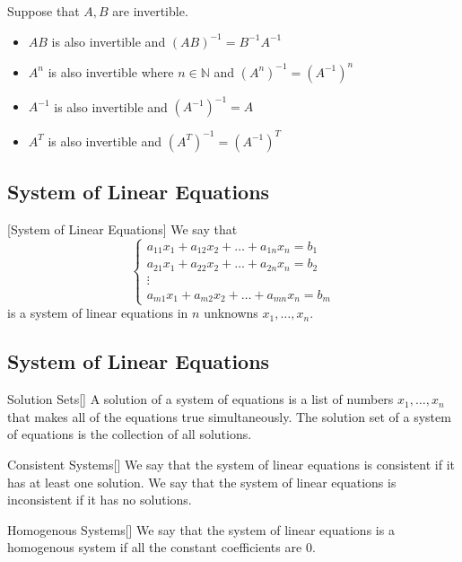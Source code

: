 \begin{thm}{}{} Suppose that $A,B$ are invertible. 
\begin{itemize}
\item $AB$ is also invertible and $(AB)^{-1}=B^{-1}A^{-1}$
\item $A^n$ is also invertible where $n\in\mathbb{N}$ and $(A^n)^{-1}=(A^{-1})^n$
\item $A^{-1}$ is also invertible and $(A^{-1})^{-1}=A$
\item $A^T$ is also invertible and $(A^T)^{-1}=(A^{-1})^T$
\end{itemize}
\end{thm}

\subsection{System of Linear Equations}
\begin{defn}{}{}[System of Linear Equations] We say that $$
\begin{cases}
a_{11}x_1+a_{12}x_2+\dots+a_{1n}x_n=b_1\\
a_{21}x_1+a_{22}x_2+\dots+a_{2n}x_n=b_2\\
\vdots\\
a_{m1}x_1+a_{m2}x_2+\dots+a_{mn}x_n=b_m
\end{cases}$$ is a system of linear equations in $n$ unknowns $x_1,\dots,x_n$. 
\end{defn}

\subsection{System of Linear Equations}
\begin{defn}{}Solution Sets{}[] A solution of a system of equations is a list of numbers $x_1,\dots,x_n$ that makes all of the equations true simultaneously. The solution set of a system of equations is the collection of all solutions. 
\end{defn}

\begin{defn}{Consistent Systems}{}[] We say that the system of linear equations is consistent if it has at least one solution. We say that the system of linear equations is inconsistent if it has no solutions. 
\end{defn}

\begin{defn}{Homogenous Systems}{}[] We say that the system of linear equations is a homogenous system if all the constant coefficients are $0$. 
\end{defn}

